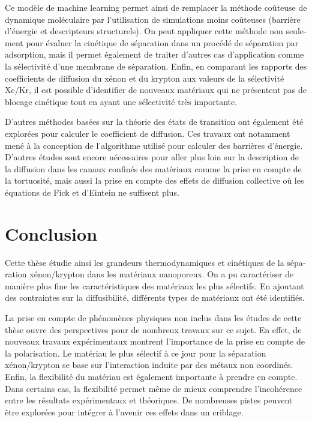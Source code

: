 \documentclass[thesis]{subfiles}
\begin{document}
\begin{otherlanguage}{french}
Ce modèle de machine learning permet ainsi de remplacer la méthode coûteuse de dynamique moléculaire par l'utilisation de simulations moins coûteuses (barrière d'énergie et descripteurs structurels). On peut appliquer cette méthode non seulement pour évaluer la cinétique de séparation dans un procédé de séparation par adsorption, mais il permet également de traiter d'autres cas d'application comme la sélectivité d'une membrane de séparation. Enfin, en comparant les rapports des coefficients de diffusion du xénon et du krypton aux valeurs de la sélectivité Xe/Kr, il est possible d'identifier de nouveaux matériaux qui ne présentent pas de blocage cinétique tout en ayant une sélectivité très importante.

D'autres méthodes basées sur la théorie des états de transition ont également été explorées pour calculer le coefficient de diffusion. Ces travaux ont notamment mené à la conception de l'algorithme utilisé pour calculer des barrières d'énergie. D'autres études sont encore nécessaires pour aller plus loin sur la description de la diffusion dans les canaux confinés des matériaux comme la prise en compte de la tortuosité, mais aussi la prise en compte des effets de diffusion collective où les équations de Fick et d'Eintein ne suffisent plus. 


\section*{Conclusion}

Cette thèse étudie ainsi les grandeurs thermodynamiques et cinétiques de la séparation xénon/krypton dans les matériaux nanoporeux. On a pu caractériser de manière plus fine les caractéristiques des matériaux les plus sélectifs. En ajoutant des contraintes sur la diffusibilité, différents types de matériaux ont été identifiés. 

La prise en compte de phénomènes physiques non inclus dans les études de cette thèse ouvre des perspectives pour de nombreux travaux sur ce sujet. En effet, de nouveaux travaux expérimentaux montrent l'importance de la prise en compte de la polarisation. Le matériau le plus sélectif à ce jour pour la séparation xénon/krypton se base sur l'interaction induite par des métaux non coordinés.\autocite{Pei_2022} Enfin, la flexibilité du matériau est également importante à prendre en compte. Dans certains cas, la flexibilité permet même de mieux comprendre l'incohérence entre les résultats expérimentaux et théoriques. De nombreuses pistes peuvent être explorées pour intégrer à l'avenir ces effets dans un criblage.\autocite{Lachet_1998,Witman_2017}

\vfill
\begin{center}
\end{center}
\vfill\vfill

\end{otherlanguage}

\OnlyInSubfile{\printglobalbibliography}
\end{document}
